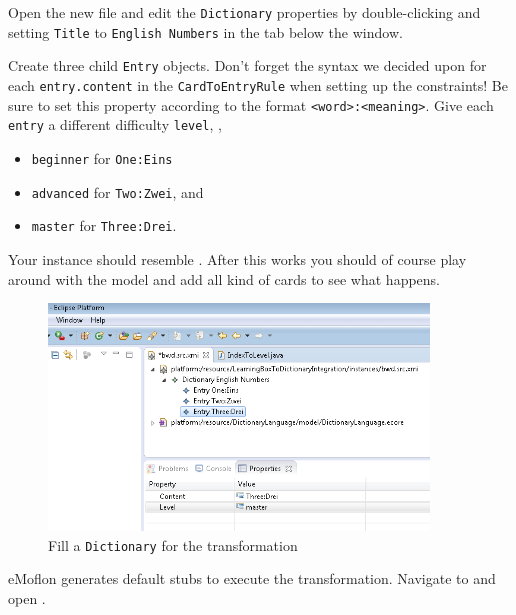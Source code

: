 \begin{stepbystep}
\newpage

\item Open the new file and edit the \texttt{Dictionary} properties by double-clicking and setting \texttt{Title} to \texttt{English Numbers} in the  tab below the window.

\vspace{0.5cm}

\item Create three child \texttt{Entry} objects.
Don't forget the syntax we decided upon for each \texttt{entry.content} in the \texttt{CardToEntryRule} when setting up the constraints! 
Be sure to set this property according to the format \texttt{<word>:<meaning>}. 
Give each \texttt{entry} a different difficulty \texttt{level}, \eg, 
\begin{itemize}
\item \texttt{beginner} for \texttt{One:Eins}
\item \texttt{advanced} for \texttt{Two:Zwei}, and 
\item \texttt{master} for \texttt{Three:Drei}.
\end{itemize}
Your instance should resemble .
After this works you should of course play around with the model and add all kind of cards to see what happens.

\begin{figure}[htbp]
\begin{center}
  \includegraphics[width=0.9\textwidth]{../../org.moflon.doc.handbook.04_tripleGraphTransformations/5_inAction/aImages/eclipse_targetThreeEntries}
  \caption{Fill a \texttt{Dictionary} for the transformation}
  \label{eclipse:dictionaryxmi}
\end{center}
\end{figure}

\item eMoflon generates default stubs to execute the transformation.
Navigate to  and open .


\end{stepbystep}
